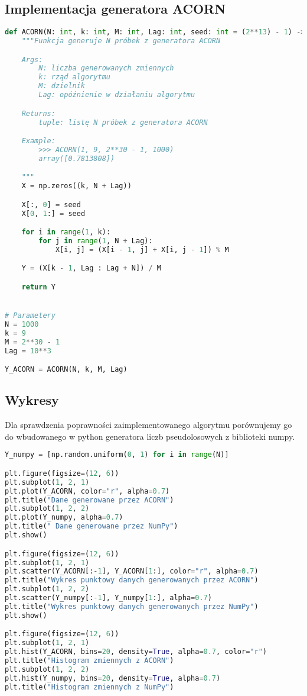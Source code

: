 \documentclass[12pt,letterpaper]{article}
\theoremstyle{definition}
\begin{document}
\subsection{Implementacja generatora ACORN}
\begin{lstlisting}[language=Python, caption=Implementacja generatora ACORN]
def ACORN(N: int, k: int, M: int, Lag: int, seed: int = (2**13) - 1) -> np.array:
    """Funkcja generuje N próbek z generatora ACORN

    Args:
        N: liczba generowanych zmiennych
        k: rząd algorytmu
        M: dzielnik
        Lag: opóźnienie w działaniu algorytmu

    Returns:
        tuple: listę N próbek z generatora ACORN

    Example:
        >>> ACORN(1, 9, 2**30 - 1, 1000)
        array([0.7813808])

    """
    X = np.zeros((k, N + Lag))

    X[:, 0] = seed
    X[0, 1:] = seed

    for i in range(1, k):
        for j in range(1, N + Lag):
            X[i, j] = (X[i - 1, j] + X[i, j - 1]) % M

    Y = (X[k - 1, Lag : Lag + N]) / M

    return Y


# Parametery
N = 1000
k = 9
M = 2**30 - 1
Lag = 10**3

Y_ACORN = ACORN(N, k, M, Lag)
\end{lstlisting}

\subsection{Wykresy}
Dla sprawdzenia poprawności zaimplementowanego algorytmu porównujemy go do wbudowanego w python generatora liczb pseudolosowych z biblioteki numpy. 

\begin{lstlisting}[language=Python, caption=Sprawdzenie podobieństw Generatora ACORN i NumPy]
Y_numpy = [np.random.uniform(0, 1) for i in range(N)]

plt.figure(figsize=(12, 6))
plt.subplot(1, 2, 1)
plt.plot(Y_ACORN, color="r", alpha=0.7)
plt.title("Dane generowane przez ACORN")
plt.subplot(1, 2, 2)
plt.plot(Y_numpy, alpha=0.7)
plt.title(" Dane generowane przez NumPy")
plt.show()

plt.figure(figsize=(12, 6))
plt.subplot(1, 2, 1)
plt.scatter(Y_ACORN[:-1], Y_ACORN[1:], color="r", alpha=0.7)
plt.title("Wykres punktowy danych generowanych przez ACORN")
plt.subplot(1, 2, 2)
plt.scatter(Y_numpy[:-1], Y_numpy[1:], alpha=0.7)
plt.title("Wykres punktowy danych generowanych przez NumPy")
plt.show()

plt.figure(figsize=(12, 6))
plt.subplot(1, 2, 1)
plt.hist(Y_ACORN, bins=20, density=True, alpha=0.7, color="r")
plt.title("Histogram zmiennych z ACORN")
plt.subplot(1, 2, 2)
plt.hist(Y_numpy, bins=20, density=True, alpha=0.7)
plt.title("Histogram zmiennych z NumPy")
\end{lstlisting}
\end{document}
